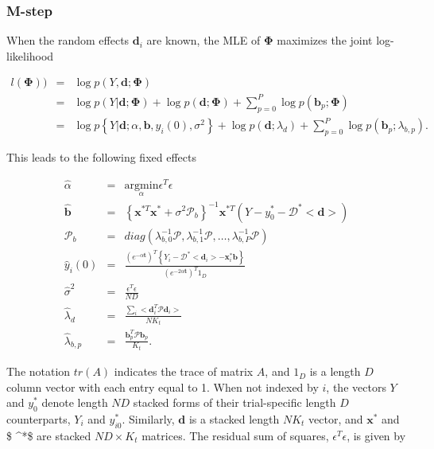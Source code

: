 \documentclass[preprint]{JASA}
\begin{document}
\hypertarget{m-step}{%
\subsubsection{M-step}\label{m-step}}

When the random effects \(\mathbf{d}_i\) are known, the MLE of
\(\mathbf{\Phi}\) maximizes the joint log-likelihood

\begin{eqnarray*}
l(\mathbf{\Phi})) &=& \log p(Y,  \mathbf{d} ; \mathbf{\Phi})\\
&=&  \log p(Y|  \mathbf{d} ; \mathbf{\Phi}) + \log p(\mathbf{d}; \mathbf{\Phi}) + \sum_{p = 0}^P\log p(\mathbf{b}_p; \mathbf{\Phi})\\
&=&  \log p\left\{Y|  \mathbf{d} ; \alpha, \mathbf{b}, y_i(0), \sigma^2\right\} + \log p(\mathbf{d} ; \lambda_d) + \sum_{p = 0}^P\log p(\mathbf{b}_p ; \lambda_{b, p}).
\end{eqnarray*}

\noindent This leads to the following fixed effects

\begin{eqnarray*}
\hat{\alpha} &=& \underset{\alpha}{\mathrm{argmin }}\epsilon^T\epsilon\\[5mm]
\widehat{\mathbf{b}} &=& \left\{\mathbf{x}^{*T}\mathbf{x}^* + \sigma^2\mathcal{P}_b \right\}^{-1}\mathbf{x}^{*T}\left(Y - y_{0}^* - \bm{\mathcal{D}}^*<\mathbf{d}> \right)\\[5mm]
\mathcal{P}_b &=& diag\left(\lambda_{b, 0}^{-1}\mathcal{P}, \lambda_{b, 1}^{-1}\mathcal{P}, \ldots,  \lambda_{b, P}^{-1}\mathcal{P} \right)\\[5mm]
\widehat{y}_i(0) &=& \frac{(e^{-\alpha\mathbf{t}} )^T \left\{Y_i -  \mathcal{D}^*<\mathbf{d}_i> - \mathbf{x}_i^*\mathbf{b} \right\}}{(e^{-2\alpha\mathbf{t}})^T 1_{D}}\\[5mm]
\widehat{\sigma}^2 &=& \frac{\epsilon^T\epsilon}{ND}\\[5mm]
\widehat{\lambda}_d &=& \frac{\sum_i <\mathbf{d}_i^T\mathcal{P}\mathbf{d}_i>}{NK_t}\\[5mm]
\widehat{\lambda}_{b, p} &=&\frac{ \mathbf{b}_p^T\mathcal{P}\mathbf{b}_p}{K_t}.
\end{eqnarray*}

\noindent The notation \(tr(A)\) indicates the trace of matrix \(A\),
and \(1_{D}\) is a length \(D\) column vector with each entry equal to
1. When not indexed by \(i\), the vectors \(Y\) and \(y_0^*\) denote
length \(ND\) stacked forms of their trial-specific length \(D\)
counterparts, \(Y_i\) and \(y_{i0}^*\). Similarly, \(\mathbf{d}\) is a
stacked length \(NK_t\) vector, and \(\mathbf{x}^*\) and \$
\^{}*\$ are stacked \(ND \times K_t\) matrices. The
residual sum of squares, \(\epsilon^T\epsilon\), is given by
\end{document}
